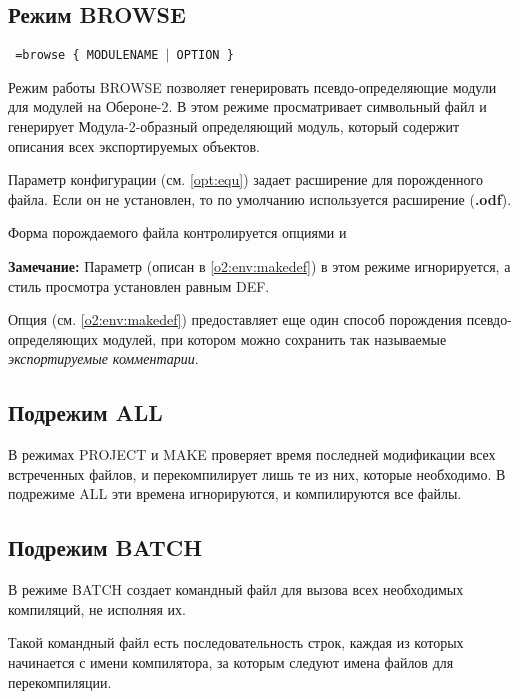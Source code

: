 \subsection{Режим BROWSE}\label{xc:modes:browse}

\begin{flushleft} \tt
  \xc{} =browse \{ MODULENAME $|$ OPTION \}
\end{flushleft}
Режим работы BROWSE позволяет генерировать псевдо-определяющие
модули для модулей на Обероне-2.
В этом режиме \xds{} просматривает символьный файл и генерирует
Модула-2-образный определяющий модуль, который содержит описания всех
экспортируемых объектов.

Параметр конфигурации  (см. \ref{opt:equ})
задает расширение для порожденного файла. Если он не установлен,
то по умолчанию используется расширение
({\bf .odf}). 

Форма порождаемого файла контролируется
опциями  и  

{\bf Замечание:} Параметр 
(описан в \ref{o2:env:makedef}) в этом режиме игнорируется,
а стиль просмотра установлен равным DEF.

Опция  (см. \ref{o2:env:makedef}) предоставляет
еще один способ порождения псевдо-определяющих модулей, при котором
можно сохранить так называемые {\em экспортируемые комментарии}.

\subsection{Подрежим ALL}

В режимах PROJECT и MAKE  \xds{} проверяет время последней модификации
всех встреченных файлов, и перекомпилирует лишь те из них, которые
необходимо. В подрежиме ALL эти времена игнорируются, 
и компилируются все файлы.

\subsection{Подрежим BATCH}\label{xc:modes:batch}

В режиме BATCH \xds{} создает командный файл для вызова
всех необходимых компиляций, не исполняя их.

Такой командный файл есть последовательность строк, каждая из
которых начинается с имени компилятора, за которым следуют 
имена файлов для перекомпиляции.

